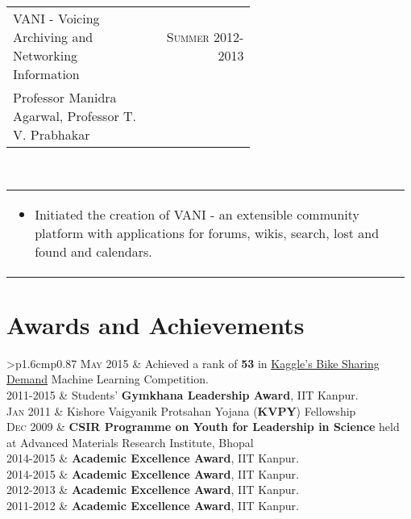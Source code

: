 \documentclass[a4paper]{article} %
\newcommand{\verticalspacing}{-0.25cm}
\newcommand{\bulletspace}{0.7cm}
\newcommand{\projectheadspacing}{6.9cm}
\newcommand{\cproject}[5]{%
    \begin{tabular}{p{0.60\linewidth}r}
        \textcolor{NavyBlue}{\small #2} & \multicolumn{1}{m{ \projectheadspacing{} }}{\raggedleft \small {\textsc{#1}}}\\
        \small {#3} & \small {#4}
    \end{tabular}\\
    \begin{tabular}{p{0.98\linewidth}}
    \vspace{-0.3cm}
        \small{#5}
    \end{tabular}
    \vspace{\verticalspacing{}}
}
\newcommand{\itemlist}[1]{%
    \def\arraystretch{1.2}
    \begin{tabular}{>{\raggedleft}p{1.6cm}p{0.87\linewidth}}
        #1
    \end{tabular}
    \def\arraystretch{1.0}
}
\begin{document}
\cproject
    {Summer 2012-2013}
    {VANI - Voicing Archiving and Networking Information}
    {Professor Manidra Agarwal, Professor T. V. Prabhakar}
    {}
    {%
        \begin{itemize}[leftmargin=\bulletspace{}]
            \item Initiated the creation of VANI - an extensible community platform with applications
                for forums, wikis, search, lost and found and calendars.
        \end{itemize}
    }

\section{Awards and Achievements}

\itemlist {%
    \textsc{\small May 2015}    & Achieved a rank of \textbf{53} in
                                  \href{https://www.kaggle.com/c/bike-sharing-demand/leaderboard}
                                  {Kaggle's Bike Sharing Demand} Machine Learning Competition. \\
    \textsc{\small 2011-2015}   & Students' \textbf{Gymkhana Leadership Award}, IIT Kanpur. \\
    \textsc{\small Jan 2011}    & Kishore Vaigyanik Protsahan Yojana (\textbf{KVPY}) Fellowship \\
    \textsc{\small Dec 2009}    & \textbf{CSIR Programme on Youth for Leadership in Science} held at
                                  Advanced Materials Research Institute, Bhopal\\

    \textsc{\small 2014-2015}   & \textbf{Academic Excellence Award}, IIT Kanpur. \\
    \textsc{\small 2014-2015}   & \textbf{Academic Excellence Award}, IIT Kanpur. \\
    \textsc{\small 2012-2013}   & \textbf{Academic Excellence Award}, IIT Kanpur. \\
    \textsc{\small 2011-2012}   & \textbf{Academic Excellence Award}, IIT Kanpur. \\
}

\end{document}
